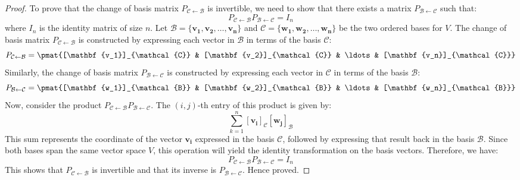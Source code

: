 \documentclass[openany]{book}
\begin{document}
\begin{proof}
    To prove that the change of basis matrix $P_{\mathcal{C} \leftarrow \mathcal{B}}$ is invertible, we need to show that there exists a matrix $P_{\mathcal{B} \leftarrow \mathcal{C}}$ such that:
    $$P_{\mathcal{C} \leftarrow \mathcal{B}} P_{\mathcal{B} \leftarrow \mathcal{C}} = I_n$$
    where $I_n$ is the identity matrix of size $n$. 
    Let $\mathcal{B} = \{\mathbf{v_1}, \mathbf{v_2}, \ldots, \mathbf{v_n}\}$ and $\mathcal{C} = \{\mathbf{w_1}, \mathbf{w_2}, \ldots, \mathbf{w_n}\}$ be the two ordered bases for $V$. The change of basis matrix $P_{\mathcal{C} \leftarrow \mathcal{B}}$ is constructed by expressing each vector in $\mathcal{B}$ in terms of the basis $\mathcal{C}$:
    $$P_{\mathcal{C} \leftarrow \mathcal{B}} = \pmat{[\mathbf{v_1}]_{\mathcal{C}} & [\mathbf{v_2}]_{\mathcal{C}} & \ldots & [\mathbf{v_n}]_{\mathcal{C}}}$$
    Similarly, the change of basis matrix $P_{\mathcal{B} \leftarrow \mathcal{C}}$ is constructed by expressing each vector in $\mathcal{C}$ in terms of the basis $\mathcal{B}$:
    $$P_{\mathcal{B} \leftarrow \mathcal{C}} = \pmat{[\mathbf{w_1}]_{\mathcal{B}} & [\mathbf{w_2}]_{\mathcal{B}} & \ldots & [\mathbf{w_n}]_{\mathcal{B}}}$$
    Now, consider the product $P_{\mathcal{C} \leftarrow \mathcal{B}} P_{\mathcal{B} \leftarrow \mathcal{C}}$. The $(i,j)$-th entry of this product is given by:
    $$\sum_{k=1}^{n} [\mathbf{v_i}]_{\mathcal{C}}[ \mathbf{w_j}]_{\mathcal{B}}$$
    This sum represents the coordinate of the vector $\mathbf{v_i}$ expressed in the basis $\mathcal{C}$, followed by expressing that result back in the basis $\mathcal{B}$. Since both bases span the same vector space $V$, this operation will yield the identity transformation on the basis vectors. Therefore, we have:
    $$P_{\mathcal{C} \leftarrow \mathcal{B}} P_{\mathcal{B} \leftarrow \mathcal{C}} = I_n$$
    This shows that $P_{\mathcal{C} \leftarrow \mathcal{B}}$ is invertible and that its inverse is $P_{\mathcal{B} \leftarrow \mathcal{C}}$. Hence proved.
\end{proof}
\end{document}
